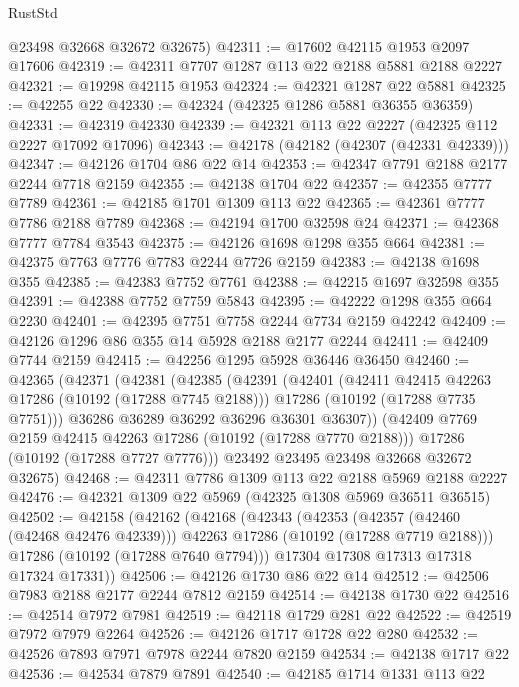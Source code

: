 \begin{lexlean}{RustStd}
\begin{coremodule}
      @23498
      @32668
      @32672
      @32675)
@42311 := @17602 @42115 @1953 @2097 @17606
@42319 := @42311 @7707 @1287 @113 @22 @2188 @5881 @2188 @2227
@42321 := @19298 @42115 @1953
@42324 := @42321 @1287 @22 @5881
@42325 := @42255 @22
@42330 := @42324 (@42325 @1286 @5881 @36355 @36359)
@42331 := @42319 @42330
@42339 := @42321 @113 @22 @2227 (@42325 @112 @2227 @17092 @17096)
@42343 := @42178 (@42182 (@42307 (@42331 @42339)))
@42347 := @42126 @1704 @86 @22 @14
@42353 := @42347 @7791 @2188 @2177 @2244 @7718 @2159
@42355 := @42138 @1704 @22
@42357 := @42355 @7777 @7789
@42361 := @42185 @1701 @1309 @113 @22
@42365 := @42361 @7777 @7786 @2188 @7789
@42368 := @42194 @1700 @32598 @24
@42371 := @42368 @7777 @7784 @3543
@42375 := @42126 @1698 @1298 @355 @664
@42381 := @42375 @7763 @7776 @7783 @2244 @7726 @2159
@42383 := @42138 @1698 @355
@42385 := @42383 @7752 @7761
@42388 := @42215 @1697 @32598 @355
@42391 := @42388 @7752 @7759 @5843
@42395 := @42222 @1298 @355 @664 @2230
@42401 := @42395 @7751 @7758 @2244 @7734 @2159 @42242
@42409 := @42126 @1296 @86 @355 @14 @5928 @2188 @2177 @2244
@42411 := @42409 @7744 @2159
@42415 := @42256 @1295 @5928 @36446 @36450
@42460 := @42365
    (@42371
      (@42381
        (@42385
          (@42391
            (@42401
              (@42411 @42415 @42263 @17286 (@10192 (@17288 @7745 @2188)))
              @17286
              (@10192 (@17288 @7735 @7751)))
            @36286
            @36289
            @36292
            @36296
            @36301
            @36307))
        (@42409 @7769 @2159 @42415 @42263 @17286 (@10192 (@17288 @7770 @2188)))
        @17286
        (@10192 (@17288 @7727 @7776)))
      @23492
      @23495
      @23498
      @32668
      @32672
      @32675)
@42468 := @42311 @7786 @1309 @113 @22 @2188 @5969 @2188 @2227
@42476 := @42321 @1309 @22 @5969 (@42325 @1308 @5969 @36511 @36515)
@42502 := @42158
    (@42162
      (@42168
        (@42343
          (@42353
            (@42357 (@42460 (@42468 @42476 @42339)))
            @42263
            @17286
            (@10192 (@17288 @7719 @2188)))
          @17286
          (@10192 (@17288 @7640 @7794)))
        @17304
        @17308
        @17313
        @17318
        @17324
        @17331))
@42506 := @42126 @1730 @86 @22 @14
@42512 := @42506 @7983 @2188 @2177 @2244 @7812 @2159
@42514 := @42138 @1730 @22
@42516 := @42514 @7972 @7981
@42519 := @42118 @1729 @281 @22
@42522 := @42519 @7972 @7979 @2264
@42526 := @42126 @1717 @1728 @22 @280
@42532 := @42526 @7893 @7971 @7978 @2244 @7820 @2159
@42534 := @42138 @1717 @22
@42536 := @42534 @7879 @7891
@42540 := @42185 @1714 @1331 @113 @22

\end{coremodule}
\end{lexlean}
